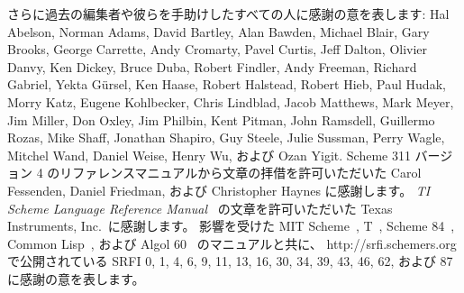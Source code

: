 さらに過去の編集者や彼らを手助けしたすべての人に感謝の意を表します:
Hal Abelson, Norman Adams, David
Bartley, Alan Bawden, Michael Blair, Gary Brooks, George Carrette,
Andy Cromarty, Pavel Curtis, Jeff Dalton, Olivier Danvy, Ken Dickey,
Bruce Duba, Robert Findler, Andy Freeman, Richard Gabriel, Yekta
G\"ursel, Ken Haase, Robert Halstead, Robert Hieb, Paul Hudak, Morry
Katz, Eugene Kohlbecker, Chris Lindblad, Jacob Matthews, Mark Meyer,
Jim Miller, Don Oxley, Jim Philbin, Kent Pitman, John Ramsdell,
Guillermo Rozas, Mike Shaff, Jonathan Shapiro, Guy Steele, Julie
Sussman, Perry Wagle, Mitchel Wand, Daniel Weise, Henry Wu, および Ozan
Yigit.
Scheme 311 バージョン 4 のリファレンスマニュアルから文章の拝借を許可いただいた
Carol Fessenden, Daniel Friedman, および Christopher Haynes に感謝します。
{\em TI Scheme Language Reference Manual}~\cite{TImanual85}
の文章を許可いただいた Texas Instruments, Inc.~に感謝します。
影響を受けた MIT Scheme~\cite{MITScheme}, T~\cite{Rees84},
Scheme 84~\cite{Scheme84}, Common Lisp~\cite{CLtL},
および Algol 60~\cite{Naur63} のマニュアルと共に、
{\cf http://srfi.schemers.org} で公開されている
SRFI 0, 1, 4, 6, 9, 11, 13, 16, 30, 34, 39, 43, 46, 62, および 87
に感謝の意を表します。


